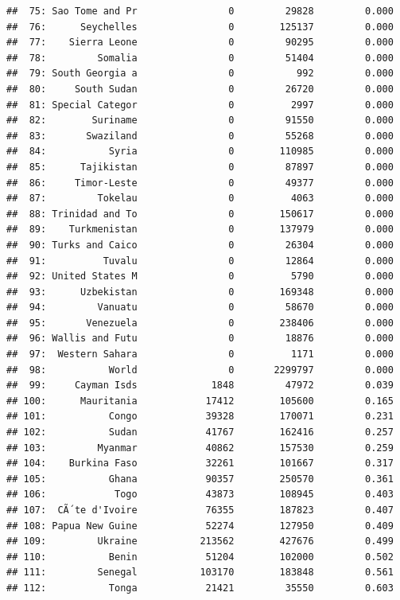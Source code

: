 \documentclass[10pt,]{article}
\begin{document}
\begin{verbatim}
##  75: Sao Tome and Pr                0         29828         0.000
##  76:      Seychelles                0        125137         0.000
##  77:    Sierra Leone                0         90295         0.000
##  78:         Somalia                0         51404         0.000
##  79: South Georgia a                0           992         0.000
##  80:     South Sudan                0         26720         0.000
##  81: Special Categor                0          2997         0.000
##  82:        Suriname                0         91550         0.000
##  83:       Swaziland                0         55268         0.000
##  84:           Syria                0        110985         0.000
##  85:      Tajikistan                0         87897         0.000
##  86:     Timor-Leste                0         49377         0.000
##  87:         Tokelau                0          4063         0.000
##  88: Trinidad and To                0        150617         0.000
##  89:    Turkmenistan                0        137979         0.000
##  90: Turks and Caico                0         26304         0.000
##  91:          Tuvalu                0         12864         0.000
##  92: United States M                0          5790         0.000
##  93:      Uzbekistan                0        169348         0.000
##  94:         Vanuatu                0         58670         0.000
##  95:       Venezuela                0        238406         0.000
##  96: Wallis and Futu                0         18876         0.000
##  97:  Western Sahara                0          1171         0.000
##  98:           World                0       2299797         0.000
##  99:     Cayman Isds             1848         47972         0.039
## 100:      Mauritania            17412        105600         0.165
## 101:           Congo            39328        170071         0.231
## 102:           Sudan            41767        162416         0.257
## 103:         Myanmar            40862        157530         0.259
## 104:    Burkina Faso            32261        101667         0.317
## 105:           Ghana            90357        250570         0.361
## 106:            Togo            43873        108945         0.403
## 107:  CÃ´te d'Ivoire            76355        187823         0.407
## 108: Papua New Guine            52274        127950         0.409
## 109:         Ukraine           213562        427676         0.499
## 110:           Benin            51204        102000         0.502
## 111:         Senegal           103170        183848         0.561
## 112:           Tonga            21421         35550         0.603

\end{verbatim}
\end{document}
